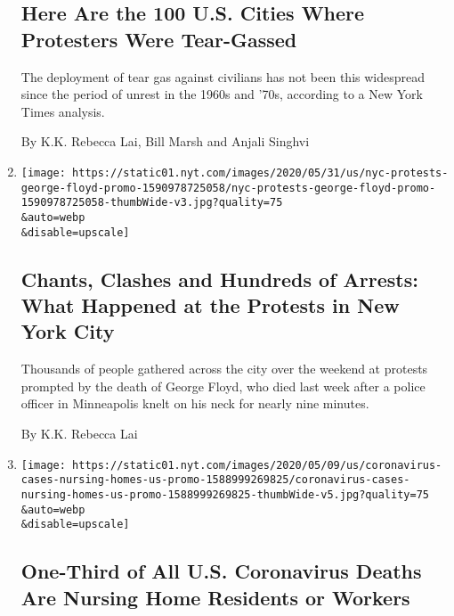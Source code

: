 \begin{enumerate}
  \hypertarget{here-are-the-100-us-cities-where-protesters-were-tear-gassed}{%
  \subsection{Here Are the 100 U.S. Cities Where Protesters Were
  Tear-Gassed}\label{here-are-the-100-us-cities-where-protesters-were-tear-gassed}}

  The deployment of tear gas against civilians has not been this
  widespread since the period of unrest in the 1960s and '70s, according
  to a New York Times analysis.

  By K.K. Rebecca Lai, Bill Marsh and Anjali Singhvi
\item
  \href{/interactive/2020/05/31/nyregion/nyc-protests-george-floyd.html}{}

  \texttt{[image: https://static01.nyt.com/images/2020/05/31/us/nyc-protests-george-floyd-promo-1590978725058/nyc-protests-george-floyd-promo-1590978725058-thumbWide-v3.jpg?quality=75\\\&auto=webp\\\&disable=upscale]}

  \hypertarget{chants-clashes-and-hundreds-of-arrests-what-happened-at-the-protests-in-new-york-city}{%
  \subsection{Chants, Clashes and Hundreds of Arrests: What Happened at
  the Protests in New York
  City}\label{chants-clashes-and-hundreds-of-arrests-what-happened-at-the-protests-in-new-york-city}}

  Thousands of people gathered across the city over the weekend at
  protests prompted by the death of George Floyd, who died last week
  after a police officer in Minneapolis knelt on his neck for nearly
  nine minutes.

  By K.K. Rebecca Lai
\item
  \href{/interactive/2020/05/09/us/coronavirus-cases-nursing-homes-us.html}{}

  \texttt{[image: https://static01.nyt.com/images/2020/05/09/us/coronavirus-cases-nursing-homes-us-promo-1588999269825/coronavirus-cases-nursing-homes-us-promo-1588999269825-thumbWide-v5.jpg?quality=75\\\&auto=webp\\\&disable=upscale]}

  \hypertarget{one-third-of-all-us-coronavirus-deaths-are-nursing-home-residents-or-workers}{%
  \subsection{One-Third of All U.S. Coronavirus Deaths Are Nursing Home
  Residents or
  Workers}\label{one-third-of-all-us-coronavirus-deaths-are-nursing-home-residents-or-workers}}


\end{enumerate}
